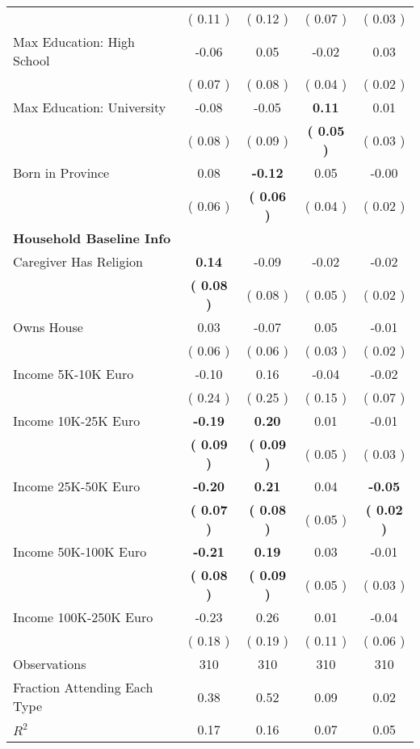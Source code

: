 \begin{table}[H]
{\begin{tabular}{lcccc}
\quad  & (     0.11 ) & (     0.12 )  & (     0.07 )  & (     0.03 )  \\
\quad Max Education: High School &     -0.06 &      0.05 &     -0.02 &      0.03 \\
\quad  & (     0.07 ) & (     0.08 )  & (     0.04 )  & (     0.02 )  \\
\quad Max Education: University &     -0.08 &     -0.05 & \textbf{     0.11} &      0.01 \\
\quad  & (     0.08 ) & (     0.09 )  & \textbf{(     0.05 )}  & (     0.03 )  \\
\quad Born in Province &      0.08 & \textbf{    -0.12} &      0.05 &     -0.00 \\
\quad  & (     0.06 ) & \textbf{(     0.06 )}  & (     0.04 )  & (     0.02 )  \\
\midrule
\textbf{Household Baseline Info} \\
\quad Caregiver Has Religion & \textbf{     0.14} &     -0.09 &     -0.02 &     -0.02 \\
\quad  & \textbf{(     0.08 )} & (     0.08 )  & (     0.05 )  & (     0.02 )  \\
\quad Owns House &      0.03 &     -0.07 &      0.05 &     -0.01 \\
\quad  & (     0.06 ) & (     0.06 )  & (     0.03 )  & (     0.02 )  \\
\quad Income 5K-10K Euro &     -0.10 &      0.16 &     -0.04 &     -0.02 \\
\quad  & (     0.24 ) & (     0.25 )  & (     0.15 )  & (     0.07 )  \\
\quad Income 10K-25K Euro & \textbf{    -0.19} & \textbf{     0.20} &      0.01 &     -0.01 \\
\quad  & \textbf{(     0.09 )} & \textbf{(     0.09 )}  & (     0.05 )  & (     0.03 )  \\
\quad Income 25K-50K Euro & \textbf{    -0.20} & \textbf{     0.21} &      0.04 & \textbf{    -0.05} \\
\quad  & \textbf{(     0.07 )} & \textbf{(     0.08 )}  & (     0.05 )  & \textbf{(     0.02 )}  \\
\quad Income 50K-100K Euro & \textbf{    -0.21} & \textbf{     0.19} &      0.03 &     -0.01 \\
\quad  & \textbf{(     0.08 )} & \textbf{(     0.09 )}  & (     0.05 )  & (     0.03 )  \\
\quad Income 100K-250K Euro &     -0.23 &      0.26 &      0.01 &     -0.04 \\
\quad  & (     0.18 ) & (     0.19 )  & (     0.11 )  & (     0.06 )  \\
\midrule
Observations & 310 & 310 & 310 & 310 \\
Fraction Attending Each Type &      0.38 &      0.52 &      0.09 &      0.02 \\
\midrule
$ R^2$ &      0.17 &      0.16 &      0.07 &      0.05 \\
\bottomrule
\end{tabular}}
\end{table}
